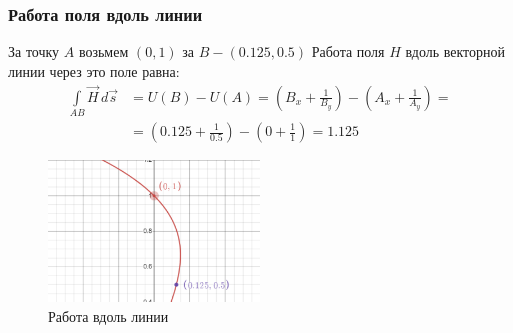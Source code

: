 \begin{frame}\frametitle{Работа поля вдоль линии}
	За точку $A$ возьмем $(0, 1)$ за $B - (0.125, 0.5)$
	Работа поля $H$ вдоль векторной линии через это поле равна: 
	\begin{align*}
		\int\limits_{AB} \vec H \, d \vec s
		 & =
		U(B) - U(A)
		=
		(B_x + \frac{1}{B_y}) - (A_x + \frac{1}{A_y}) = \\
		 & = (0.125 + \frac{1}{0.5}) - (0 + \frac{1}{1}) = 1.125
		\label{eq:work_across_line}
	\end{align*}
	\begin{figure}
		\centering
		\includegraphics[width=0.5\textwidth]{figures/potential_work.pdf}
		\caption{Работа вдоль линии}\label{fig:potential_work}
	\end{figure}
\end{frame}

